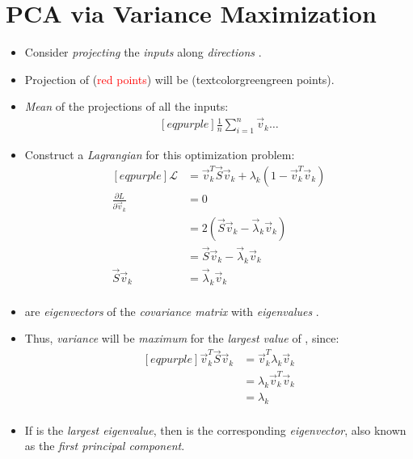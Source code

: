 \documentclass[
	number={7},
	title={Principal Component Analysis}
]{cs584notes}
\begin{document}
\section{PCA via Variance Maximization}\label{sec:pca-via-variance-maximization}
\begin{itemize}
	\item Consider \emph{projecting} the \emph{inputs}  along \emph{directions} .
	\item Projection of  (\textcolor{red}{red points}) will be  (textcolor{green}{green points}).
	\item \emph{Mean} of the projections of all the inputs:
	\begin{equation*}
	\begin{aligned}[eqpurple]
		\frac{1}{n} \sum_{i=1}^{n} \vec{v}_{k}\dots
	\end{aligned}
	\end{equation*}
	\item Construct a \emph{Lagrangian} for this optimization problem:
	\begin{equation*}
	\begin{aligned}[eqpurple]
		\mathcal{L} &= \vec{v}_{k}^{T}\vec{S}\vec{v}_{k} + \lambda_{k}( 1 - \vec{v}_{k}^{T}\vec{v}_{k})\\
		\frac{\partial L}{\partial \vec{v}_{k}} &= 0\\
		&= 2\left( \vec{S}\vec{v}_{k} - \vec{\lambda}_{k}\vec{v}_{k} \right)\\
		&= \vec{S}\vec{v}_{k} - \vec{\lambda}_{k}\vec{v}_{k} \\
		\vec{S}\vec{v}_{k} &= \vec{\lambda}_{k}\vec{v}_{k} \\
	\end{aligned}
	\end{equation*}
	\item {} are \emph{eigenvectors} of the \emph{covariance matrix}  with \emph{eigenvalues} .
	\item Thus, \emph{variance}  will be \emph{maximum} for the \emph{largest value} of , since:
	\begin{equation*}
	\begin{aligned}[eqpurple]
		\vec{v}_{k}^{T}\vec{S}\vec{v}_{k} &= \vec{v}_{k}^{T}\lambda_{k}\vec{v}_{k}\\
		&= \lambda_{k}\vec{v}_{k}^{T}\vec{v}_{k}\\
		&= \lambda_{k}\\
	\end{aligned}
	\end{equation*}
	\item If  is the \emph{largest eigenvalue}, then  is the corresponding \emph{eigenvector}, also known as the \emph{first principal component}.
\end{itemize}
\end{document}
